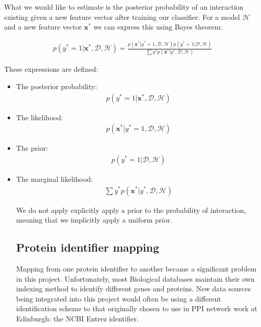 What we would like to estimate is the posterior probability of an interaction existing given a new feature vector after training our classifier.
For a model $\mathcal{H}$ and a new feature vector $\mathbf{x}^{*}$ we can express this using Bayes theorem:

\begin{align}
    p(y^{*} = 1 | \mathbf{x}^{*}, \mathcal{D}, \mathcal{H}) = \frac{ p(\mathbf{x}^{*}| y^{*} = 1 , \mathcal{D}, \mathcal{H}) p( y^{*} = 1 | \mathcal{D}, \mathcal{H})}{ \sum{y^{*}} p( \mathbf{x}^{*} | y^{*}, \mathcal{D}, \mathcal{H})}
\end{align}

These expressions are defined:

\begin{itemize}
    \item The posterior probability:
        \begin{align}
            p(y^{*} = 1 | \mathbf{x}^{*}, \mathcal{D}, \mathcal{H})
        \end{align}
    \item The likelihood:
        \begin{align}
            p(\mathbf{x}^{*}| y^{*} = 1 , \mathcal{D}, \mathcal{H})
        \end{align}
    \item The prior:
        \begin{align}
            p( y^{*} = 1 | \mathcal{D}, \mathcal{H})
        \end{align}
    \item The marginal likelihood:
        \begin{align}
            \sum{y^{*}} p( \mathbf{x}^{*} | y^{*}, \mathcal{D}, \mathcal{H})
        \end{align}

We do not apply explicitly apply a prior to the probability of interaction, meaning that we implicitly apply a uniform prior.

\subsection{Protein identifier mapping}

Mapping from one protein identifier to another became a significant problem in this project.
Unfortunately, most Biological databases maintain their own indexing method to identify different genes and proteins.
New data sources being integrated into this project would often be using a different identification scheme to that originally chosen to use in PPI network work at Edinburgh: the NCBI Entrez identifier.


\end{itemize}
